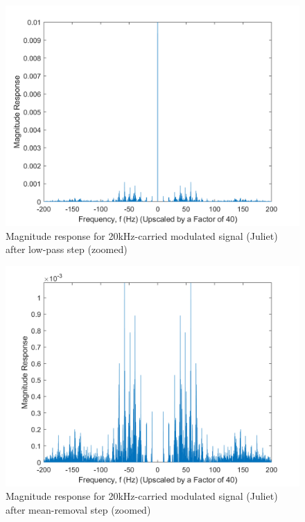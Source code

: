 \documentclass[journal]{IEEEtran}
\begin{document}
\begin{figure}[!htb]
	\centering
  \includegraphics[width=\columnwidth]{JulietLowPassMagZoomed.png}
    \caption{Magnitude response for 20kHz-carried modulated signal (Juliet) after low-pass step (zoomed)}   
    \label{JulietLowpassZoomed}
\end{figure}

\begin{figure}[!htb]
	\centering
  \includegraphics[width=\columnwidth]{JulietMeanRemovedZoomed.png}
    \caption{Magnitude response for 20kHz-carried modulated signal (Juliet) after mean-removal step (zoomed)}   
    \label{JulietMeanRemoved}
\end{figure}
\end{document}

